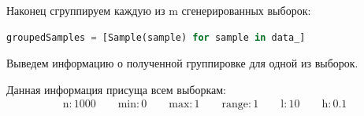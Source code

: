 \documentclass[a4paper, 14pt]{extarticle}
\begin{document}
\newpage

Наконец сгруппируем каждую из m сгенерированных выборок:
\begin{center}
  \begin{lstlisting}[language=Python]
groupedSamples = [Sample(sample) for sample in data_]
  \end{lstlisting}
\end{center}

Выведем информацию о полученной группировке для одной из выборок.

Данная информация присуща всем выборкам:
\begin{gather*}
  \text{n}: 1000 \qquad \text{min}: 0 \qquad \text{max}: 1 \qquad \text{range}: 1 \qquad \text{l}: 10 \qquad \text{h}: 0.1 \\
\end{gather*}
\vspace{-60pt}
\end{document}
